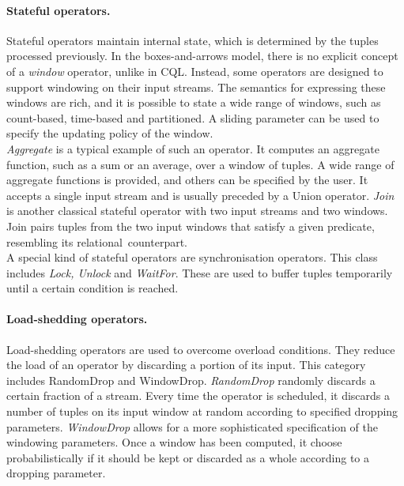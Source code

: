 \paragraph{Stateful operators.} Stateful operators maintain internal state, which is determined by the
tuples processed previously. 
In the boxes-and-arrows model, there is no explicit concept of a \emph{window} operator, unlike in CQL.
Instead, some operators are designed to support windowing on their input streams. The semantics for
expressing these windows are rich, and it is possible to state a wide range of windows, such as
count-based, time-based and partitioned. A sliding parameter can be used to specify the updating policy
of the window.\\
\emph{Aggregate} is a typical example of such an operator. It computes an aggregate function, such as a
sum or an average, over a window of tuples. A wide range of aggregate functions is provided, and others
can be specified by the user. It accepts a single input stream and is usually preceded by a Union operator. 
\emph{Join} is another classical stateful operator with two input streams and two windows. Join pairs
tuples from the two input windows that satisfy a given predicate, resembling its
relational~counterpart.\\
A special kind of stateful operators are synchronisation operators. This class includes \emph{Lock,
Unlock} and \emph{WaitFor}. These are used to buffer tuples temporarily until a certain condition is
reached.

\paragraph{\mbox{Load-shedding} operators.} Load-shedding operators are used to overcome overload
conditions. They reduce the load of an operator by discarding a portion of its input. This category includes RandomDrop and
WindowDrop. \emph{RandomDrop} randomly discards a certain fraction of a stream. Every time the operator
is scheduled, it discards a number of tuples on its input window at random according to specified
dropping parameters. \emph{WindowDrop} allows for a more sophisticated specification of the windowing
parameters. Once a window has been computed, it choose probabilistically if it should be kept or
discarded as a whole according to a dropping parameter.\\


